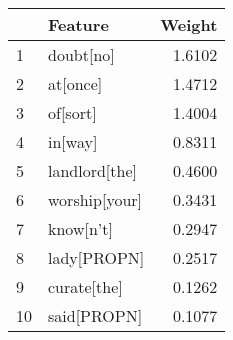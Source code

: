 \begin{tabular}{llr}
\toprule
{} &        Feature &  Weight \\
\midrule
1  &      doubt[no] &  1.6102 \\
2  &       at[once] &  1.4712 \\
3  &       of[sort] &  1.4004 \\
4  &        in[way] &  0.8311 \\
5  &  landlord[the] &  0.4600 \\
6  &  worship[your] &  0.3431 \\
7  &      know[n't] &  0.2947 \\
8  &    lady[PROPN] &  0.2517 \\
9  &    curate[the] &  0.1262 \\
10 &    said[PROPN] &  0.1077 \\
\bottomrule
\end{tabular}
